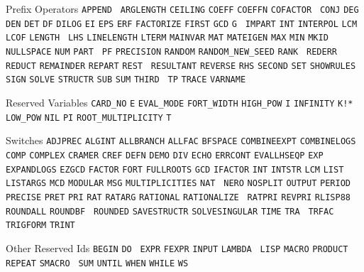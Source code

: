 \begin{list}{}
\item[Prefix Operators] {\tt APPEND} {\tt
ARGLENGTH} {\tt CEILING} {\tt COEFF} {\tt COEFFN} {\tt COFACTOR} {\tt
CONJ} {\tt DEG} {\tt DEN} {\tt DET} {\tt DF} {\tt DILOG} {\tt EI}
{\tt EPS} {\tt ERF} {\tt FACTORIZE} {\tt FIRST} {\tt GCD} {\tt G} {\tt
IMPART} {\tt INT} {\tt INTERPOL} {\tt LCM} {\tt LCOF} {\tt LENGTH} {\tt
LHS} {\tt LINELENGTH} {\tt LTERM} {\tt MAINVAR} {\tt MAT} {\tt MATEIGEN}
{\tt MAX} {\tt MIN} {\tt MKID} {\tt NULLSPACE} {\tt NUM} {\tt PART} {\tt
PF} {\tt PRECISION} {\tt RANDOM} {\tt RANDOM\_NEW\_SEED} {\tt RANK} {\tt
REDERR} {\tt REDUCT} {\tt REMAINDER} {\tt REPART} {\tt REST} {\tt
RESULTANT} {\tt REVERSE} {\tt RHS} {\tt SECOND} {\tt SET} {\tt SHOWRULES}
{\tt SIGN} {\tt SOLVE} {\tt STRUCTR} {\tt SUB} {\tt SUM} {\tt THIRD} {\tt
TP} {\tt TRACE} {\tt VARNAME}

\item[Reserved Variables] {\tt CARD\_NO} {\tt E} {\tt EVAL\_MODE}
{\tt FORT\_WIDTH} {\tt HIGH\_POW} {\tt I} {\tt INFINITY} {\tt K!*} {\tt
LOW\_POW} {\tt NIL} {\tt PI} {\tt ROOT\_MULTIPLICITY} {\tt T}

\item[Switches] {\tt ADJPREC} {\tt ALGINT} {\tt ALLBRANCH} {\tt ALLFAC}
{\tt BFSPACE} {\tt COMBINEEXPT} {\tt COMBINELOGS}
{\tt COMP} {\tt COMPLEX} {\tt CRAMER} {\tt CREF} {\tt DEFN} {\tt DEMO}
{\tt DIV} {\tt ECHO} {\tt ERRCONT} {\tt EVALLHSEQP} {\tt EXP} {\tt
EXPANDLOGS} {\tt EZGCD} {\tt FACTOR} {\tt FORT} {\tt FULLROOTS} {\tt GCD}
{\tt IFACTOR} {\tt INT} {\tt INTSTR} {\tt LCM} {\tt LIST} {\tt LISTARGS}
{\tt MCD} {\tt MODULAR} {\tt MSG} {\tt MULTIPLICITIES} {\tt NAT} {\tt
NERO} {\tt NOSPLIT} {\tt OUTPUT} {\tt PERIOD} {\tt PRECISE} {\tt PRET}
{\tt PRI} {\tt RAT} {\tt RATARG} {\tt RATIONAL} {\tt RATIONALIZE} {\tt
RATPRI} {\tt REVPRI} {\tt RLISP88} {\tt ROUNDALL} {\tt ROUNDBF} {\tt
ROUNDED} {\tt SAVESTRUCTR} {\tt SOLVESINGULAR} {\tt TIME} {\tt TRA} {\tt
TRFAC} {\tt TRIGFORM} {\tt TRINT}

\item[Other Reserved Ids] {\tt BEGIN} {\tt DO} {\tt
EXPR} {\tt FEXPR} {\tt INPUT} {\tt LAMBDA} {\tt
LISP} {\tt MACRO} {\tt PRODUCT} {\tt REPEAT} {\tt SMACRO} {\tt
SUM} {\tt UNTIL} {\tt WHEN} {\tt WHILE} {\tt WS}

\end{list}


\printindex


